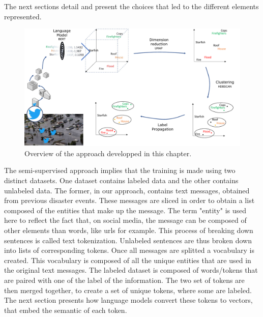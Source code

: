 The next sections detail and present the choices that led to the different elements represented.

\begin{figure}[htb]
    \centering
    \includegraphics[width=\textwidth]{figures/chap-4/big-picture.pdf}
    \caption{Overview of the approach developped in this chapter.}
    \label{processing:big-picture}
\end{figure}

The semi-supervised approach implies that the training is made using two distinct datasets.
One dataset contains labeled data and the other contains unlabeled data.
The former, in our approach, contains text messages, obtained from previous disaster events.
These messages are sliced in order to obtain a list composed of the entities that make up the message.
The term "entity" is used here to reflect the fact that, on social media, the message can
be composed of other elements than words, like urls for example.
This process of breaking down sentences is called text tokenization.
Unlabeled sentences are thus broken down into lists of corresponding tokens.
Once all messages are splitted a vocabulary is created.
This vocabulary is composed of all the unique entities that are used in the original text
messages.
The labeled dataset is composed of words/tokens that are paired with one of the label
of the information.
The two set of tokens are then merged together, to create a set of unique tokens, where
some are labeled.
The next section presents how language models convert these tokens to vectors, that
embed the semantic of each token.

